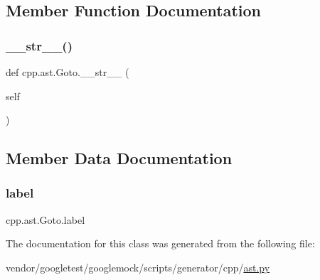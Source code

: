 \subsection{Member Function Documentation}
\mbox{\label{classcpp_1_1ast_1_1_goto_a508b6bc091cf06bfed73a33368c236c9}} 
\subsubsection{\texorpdfstring{\+\_\+\+\_\+str\+\_\+\+\_\+()}{\_\_str\_\_()}}
{\footnotesize\ttfamily def cpp.\+ast.\+Goto.\+\_\+\+\_\+str\+\_\+\+\_\+ (\begin{DoxyParamCaption}\item[{}]{self }\end{DoxyParamCaption})}



\subsection{Member Data Documentation}
\mbox{\label{classcpp_1_1ast_1_1_goto_a685284ea5f3b21f39aff7f5db841c8f5}} 
\subsubsection{\texorpdfstring{label}{label}}
{\footnotesize\ttfamily cpp.\+ast.\+Goto.\+label}



The documentation for this class was generated from the following file\+:\begin{DoxyCompactItemize}
\item 
vendor/googletest/googlemock/scripts/generator/cpp/\hyperlink{ast_8py}{ast.\+py}\end{DoxyCompactItemize}
